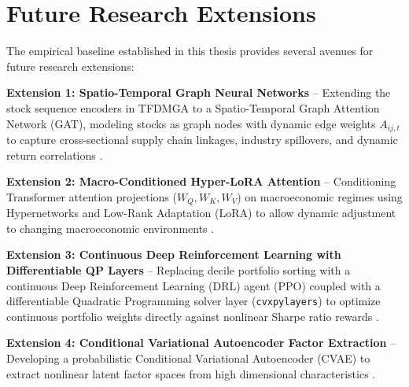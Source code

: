 \section{Future Research Extensions}
The empirical baseline established in this thesis provides several avenues for future research extensions:

\noindent \textbf{Extension 1: Spatio-Temporal Graph Neural Networks} -- Extending the stock sequence encoders in TFDMGA to a Spatio-Temporal Graph Attention Network (GAT), modeling stocks as graph nodes with dynamic edge weights $A_{ij,t}$ to capture cross-sectional supply chain linkages, industry spillovers, and dynamic return correlations \citep{vaswani2017attention, chen2023deep}.

\vspace{0.2cm}
\noindent \textbf{Extension 2: Macro-Conditioned Hyper-LoRA Attention} -- Conditioning Transformer attention projections ($W_Q, W_K, W_V$) on macroeconomic regimes using Hypernetworks and Low-Rank Adaptation (LoRA) to allow dynamic adjustment to changing macroeconomic environments \citep{lim2021temporal}.

\vspace{0.2cm}
\noindent \textbf{Extension 3: Continuous Deep Reinforcement Learning with Differentiable QP Layers} -- Replacing decile portfolio sorting with a continuous Deep Reinforcement Learning (DRL) agent (PPO) coupled with a differentiable Quadratic Programming solver layer (\texttt{cvxpylayers}) to optimize continuous portfolio weights directly against nonlinear Sharpe ratio rewards \citep{lopez2020machine, novy2016taxonomy}.

\vspace{0.2cm}
\noindent \textbf{Extension 4: Conditional Variational Autoencoder Factor Extraction} -- Developing a probabilistic Conditional Variational Autoencoder (CVAE) to extract nonlinear latent factor spaces from high dimensional characteristics \citep{gu2021autoencoder, kelly2019characteristics, chen2023deep}.
